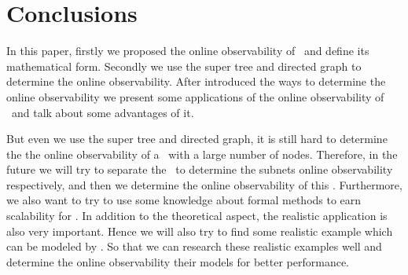 \section{Conclusions}
\label{sec:con}

In this paper, firstly we proposed the online observability of \BCNs\ and define its mathematical form. Secondly we use the super tree and directed graph to determine the online observability. After introduced the ways to determine the online observability we present some applications of the online observability of \BCNs\ and talk about some advantages of it. %

But even we use the super tree and directed graph, it is still hard to determine the  the online observability of a \BCN\ with a large number of nodes. Therefore, in the future we will try to separate the \BCN\ to determine the subnets online observability respectively, and then we determine the online observability of this \BCN. Furthermore, we also want to try to use some knowledge about formal methods to earn scalability for \BCNs. In addition to the theoretical aspect, the realistic application is also very important. Hence we will also try to find some realistic example which can be modeled by \BCNs. So that we can research these realistic examples well and determine the online observability their models for better performance.